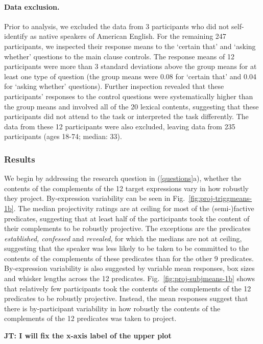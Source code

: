 \documentclass[11pt,fleqn]{article}
\newcommand{\6}{\mbox{$[\hspace*{-.6mm}[$}}
\newcommand{\9}{\mbox{$]\hspace*{-.6mm}]$}}
\newcommand{\figref}[1]{Fig.~\ref{#1}}
\newcommand{\jt}[1]{\textbf{\color{blue}JT: #1}}
\begin{document}
\paragraph{Data exclusion.} Prior to analysis, we excluded the data from 3 participants who did not self-identify as native speakers of American English. For the remaining 247 participants, we inspected their response means to the `certain that' and `asking whether' questions to the main clause controls. The response means of 12 participants were more than 3 standard deviations above the group means for at least one type of question (the group means were 0.08 for `certain that' and 0.04 for `asking whether' questions). Further inspection revealed that these participants' responses to the control questions were systematically higher than the group means and involved all of the 20 lexical contents, suggesting that these participants did not attend to the task or interpreted the task differently. The data from these 12 participants were also excluded, leaving data from 235 participants (ages 18-74; median: 33).

\subsubsection{Results}

We begin by addressing the research question in (\ref{questions}a), whether the contents of the complements of the 12 target expressions vary in how robustly they project. By-expression variability can be seen in \figref{fig:proj-triggmeans-1b}.  The median projectivity ratings are at ceiling for most of the (semi-)factive predicates, suggesting that at least half of the participants took the content of their complements to be robustly projective. The exceptions are the predicates {\em established, confessed} and {\em revealed}, for which the medians are not at ceiling, suggesting that the speaker was less likely to be taken to be committed to the contents of the complements of these predicates than for the other 9 predicates. By-expression variability is also suggested by variable mean responses, box sizes and whisker lengths across the 12 predicates. \figref{fig:proj-subjmeans-1b} shows that relatively few participants took the contents of the complements of the 12 predicates to be robustly projective. Instead, the mean responses suggest that there is by-participant variability in how robustly the contents of the complements of the 12 predicates was taken to project.

\jt{I will fix the x-axis label of the upper plot}
\end{document}
